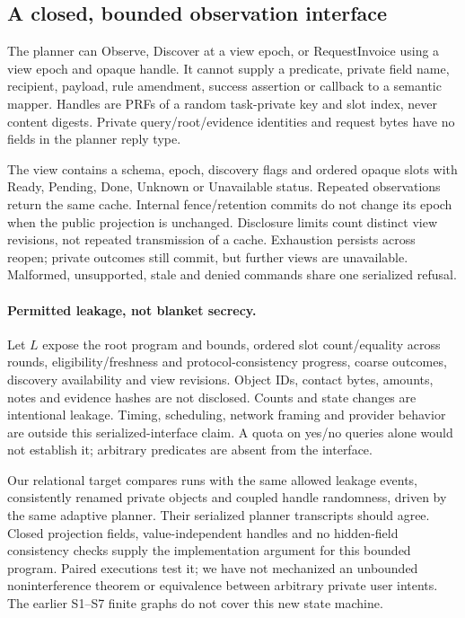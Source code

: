 \documentclass[letterpaper,twocolumn,10pt]{article}
\begin{document}
\subsection{A closed, bounded observation interface}

The planner can Observe, Discover at a view epoch, or RequestInvoice using a
view epoch and opaque handle. It cannot supply a predicate, private field name,
recipient, payload, rule amendment, success assertion or callback to a semantic
mapper. Handles are PRFs of a random task-private key and slot index, never
content digests. Private query/root/evidence identities and request bytes have
no fields in the planner reply type.

The view contains a schema, epoch, discovery flags and ordered opaque slots
with Ready, Pending, Done, Unknown or Unavailable status. Repeated observations
return the same cache. Internal fence/retention commits do not change its epoch
when the public projection is unchanged. Disclosure limits count distinct view
revisions, not repeated transmission of a cache. Exhaustion persists across
reopen; private outcomes still commit, but further views are unavailable.
Malformed, unsupported, stale and denied commands share one serialized refusal.

\paragraph{Permitted leakage, not blanket secrecy.}
Let $L$ expose the root program and bounds, ordered slot count/equality across
rounds, eligibility/freshness and protocol-consistency progress, coarse outcomes,
discovery availability and view revisions. Object IDs, contact bytes, amounts,
notes and evidence hashes are not disclosed. Counts and state changes are
intentional leakage. Timing, scheduling, network framing and provider behavior
are outside this serialized-interface claim. A quota on yes/no queries alone
would not establish it; arbitrary predicates are absent from the interface.

Our relational target compares runs with the same allowed leakage events,
consistently renamed private objects and coupled handle randomness, driven by
the same adaptive planner. Their serialized planner transcripts should agree.
Closed projection fields, value-independent handles and no hidden-field
consistency checks supply the implementation argument for this bounded
program. Paired executions test it; we have not mechanized an unbounded
noninterference theorem or equivalence between arbitrary private user intents.
The earlier S1--S7 finite graphs do not cover this new state machine.
\end{document}

